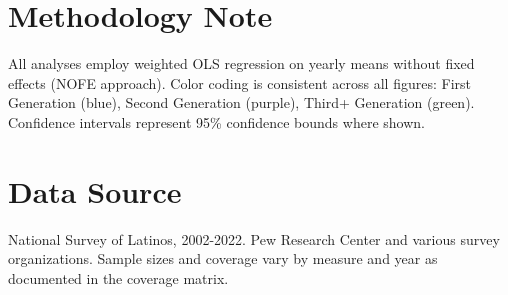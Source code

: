 \documentclass{article}
\begin{document}
\section*{Methodology Note}

All analyses employ weighted OLS regression on yearly means without fixed effects (NOFE approach). Color coding is consistent across all figures: First Generation (blue), Second Generation (purple), Third+ Generation (green). Confidence intervals represent 95\% confidence bounds where shown.

\section*{Data Source}

National Survey of Latinos, 2002-2022. Pew Research Center and various survey organizations. Sample sizes and coverage vary by measure and year as documented in the coverage matrix.
\end{document}

